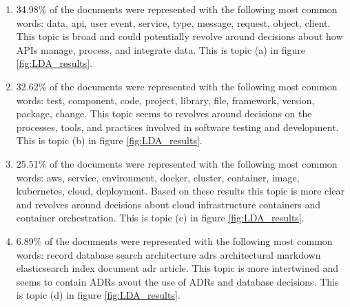         \begin{enumerate}
            \item 34.98\% of the documents were represented with the following most common words: data, api, user event, service, type, message, request, object, client. This topic is broad and could potentially revolve around decisions about how APIs manage, process, and integrate data. This is topic (a) in figure \ref{fig:LDA_results}.
            
            \item 32.62\% of the documents were represented with the following most common words: test, component, code, project, library, file, framework, version, package, change. This topic seems to revolves around decisions on the processes, tools, and practices involved in software testing and development. This is topic (b) in figure \ref{fig:LDA_results}.
    
            \item 25.51\% of the documents were represented with the following most common words: aws, service, environment, docker, cluster, container, image, kubernetes, cloud, deployment. Based on these results this topic is more clear and revolves around decisions about cloud infrastructure containers and container orchestration. This is topic (c) in figure \ref{fig:LDA_results}.
    
            \item 6.89\% of the documents were represented with the following most common words: record database search architecture adrs architectural markdown elasticsearch index document adr article. This topic is more intertwined and seems to contain ADRs avout the use of ADRs and database decisions. This is topic (d) in figure \ref{fig:LDA_results}.
        \end{enumerate}

